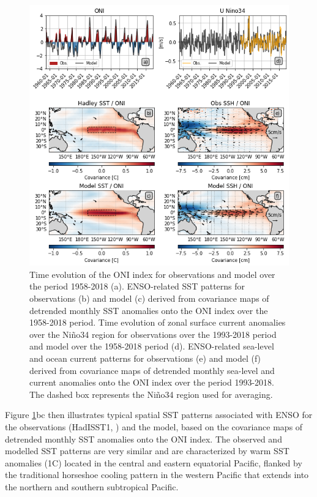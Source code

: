 \begin{figure}[h!tp]
	\centering
	\includegraphics[scale=0.6]{figs/fig1.png}
	\caption{Time evolution of the ONI index for observations and model over the period 1958-2018 (a). ENSO-related SST patterns for observations \citep{raynerGlobalAnalysesSea2003} (b) and model (c) derived from covariance maps of detrended monthly SST anomalies onto the ONI index over the 1958-2018 period. Time evolution of zonal surface current anomalies over the Niño34 region for observations over the 1993-2018 period \citep{rioGOCEOceanCirculation2014} and model over the 1958-2018 period (d). ENSO-related sea-level and ocean current patterns for observations (e) and model (f) derived from covariance maps of detrended monthly sea-level and current anomalies onto the ONI index over the period 1993-2018. The dashed box represents the Niño34 region used for averaging.}
	\label{fig:nemo-had-sst}
\end{figure}

Figure \ref{fig:nemo-had-sst}bc then illustrates typical spatial SST patterns associated with ENSO for the observations (HadISST1, \citealp{raynerGlobalAnalysesSea2003}) and the model, based on the covariance maps of detrended monthly SST anomalies onto the ONI index. The observed and modelled SST patterns are very similar and are characterized by warm SST anomalies (1\degree{}C) located in the central and eastern equatorial Pacific, flanked by the traditional horseshoe cooling pattern in the western Pacific that extends into the northern and southern subtropical Pacific.    


